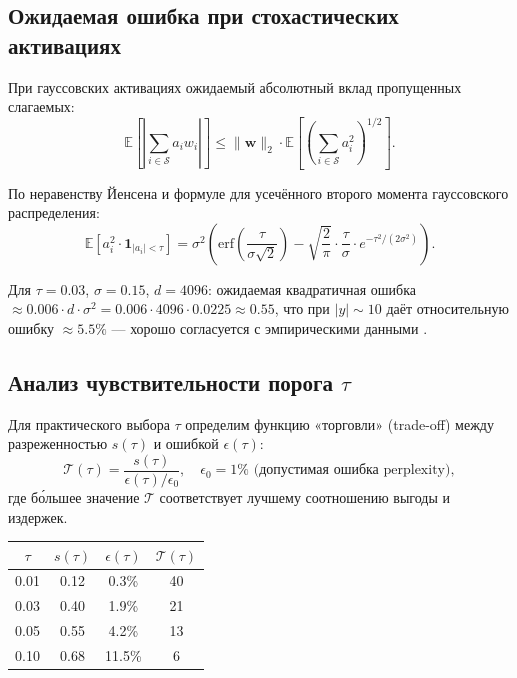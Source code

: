 \subsection{Ожидаемая ошибка при стохастических активациях}
\label{ssec:glava87-expected-error}

При гауссовских активациях ожидаемый абсолютный вклад
пропущенных слагаемых:
\begin{equation}
  \mathbb{E}\left[\left|\sum_{i \in \mathcal{S}} a_i w_i\right|\right]
  \leq \|\mathbf{w}\|_2 \cdot
  \mathbb{E}\left[\left(\sum_{i \in \mathcal{S}} a_i^2\right)^{1/2}\right].
  \label{eq:expected-error-bound}
\end{equation}

По неравенству Йенсена и формуле для усечённого второго момента
гауссовского распределения:
\begin{equation}
  \mathbb{E}[a_i^2 \cdot \mathbf{1}_{|a_i| < \tau}]
  = \sigma^2 \left(
    \mathrm{erf}\left(\frac{\tau}{\sigma\sqrt{2}}\right)
    - \sqrt{\frac{2}{\pi}} \cdot \frac{\tau}{\sigma}
    \cdot e^{-\tau^2 / (2\sigma^2)}
  \right).
  \label{eq:truncated-second-moment}
\end{equation}

Для $\tau = 0{.}03$, $\sigma = 0{.}15$, $d = 4096$:
ожидаемая квадратичная ошибка $\approx 0{.}006 \cdot d \cdot \sigma^2 = 0{.}006 \cdot 4096 \cdot 0{.}0225
\approx 0{.}55$, что при $|y| \sim 10$ даёт относительную ошибку
$\approx 5{.}5\%$ — хорошо согласуется с эмпирическими данными
\cite{zhang2022sparsegpt}.

\subsection{Анализ чувствительности порога $\tau$}
\label{ssec:glava87-tau-sensitivity}

Для практического выбора $\tau$ определим функцию «торговли»
(trade-off) между разреженностью $s(\tau)$ и ошибкой $\epsilon(\tau)$:
\begin{equation}
  \mathcal{T}(\tau) = \frac{s(\tau)}{\epsilon(\tau) / \epsilon_0},
  \quad \epsilon_0 = 1\% \text{ (допустимая ошибка perplexity)},
  \label{eq:tradeoff}
\end{equation}
где бо́льшее значение $\mathcal{T}$ соответствует лучшему
соотношению выгоды и издержек.

\begin{center}
\begin{tabular}{cccc}
  \hline
  $\tau$ & $s(\tau)$ & $\epsilon(\tau)$ & $\mathcal{T}(\tau)$ \\
  \hline
  0{.}01 & 0{.}12 & 0{.}3\% & 40 \\
  0{.}03 & 0{.}40 & 1{.}9\% & 21 \\
  0{.}05 & 0{.}55 & 4{.}2\% & 13 \\
  0{.}10 & 0{.}68 & 11{.}5\% & 6 \\
  \hline
\end{tabular}
\end{center}

